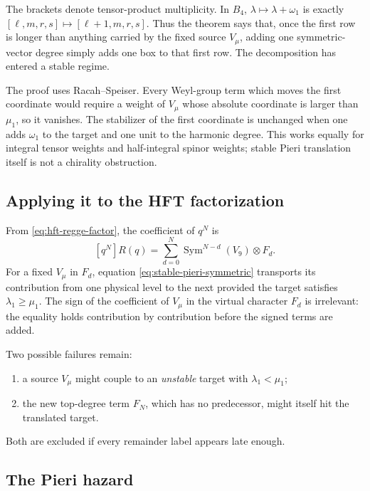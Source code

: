 \documentclass[11pt,a4paper]{article}
\theoremstyle{definition}
\begin{document}
The brackets denote tensor-product multiplicity.  In $B_4$,
$\lambda\mapsto\lambda+\omega_1$ is exactly
$[\ell,m,r,s]\mapsto[\ell+1,m,r,s]$.  Thus the theorem says that, once the
first row is longer than anything carried by the fixed source $V_\mu$, adding
one symmetric-vector degree simply adds one box to that first row.  The
decomposition has entered a stable regime.

The proof uses Racah--Speiser.  Every Weyl-group term which moves the first
coordinate would require a weight of $V_\mu$ whose absolute coordinate is
larger than $\mu_1$, so it vanishes.  The stabilizer of the first coordinate
is unchanged when one adds $\omega_1$ to the target and one unit to the
harmonic degree.  This works equally for integral tensor weights and
half-integral spinor weights; stable Pieri translation itself is not a
chirality obstruction.

\subsection{Applying it to the HFT factorization}

From \eqref{eq:hft-regge-factor}, the coefficient of $q^N$ is
\[
   [q^N]R(q)
   =\sum_{d=0}^{N}\operatorname{Sym}^{N-d}(V_9)\otimes F_d.
\]
For a fixed $V_\mu$ in $F_d$, equation
\eqref{eq:stable-pieri-symmetric} transports its contribution from one
physical level to the next provided the target satisfies
$\lambda_1\geq\mu_1$.  The sign of the coefficient of $V_\mu$ in the virtual
character $F_d$ is irrelevant: the equality holds contribution by
contribution before the signed terms are added.

Two possible failures remain:
\begin{enumerate}
  \item a source $V_\mu$ might couple to an \emph{unstable} target with
        $\lambda_1<\mu_1$;
  \item the new top-degree term $F_N$, which has no predecessor, might itself
        hit the translated target.
\end{enumerate}
Both are excluded if every remainder label appears late enough.

\subsection{The Pieri hazard}
\end{document}
